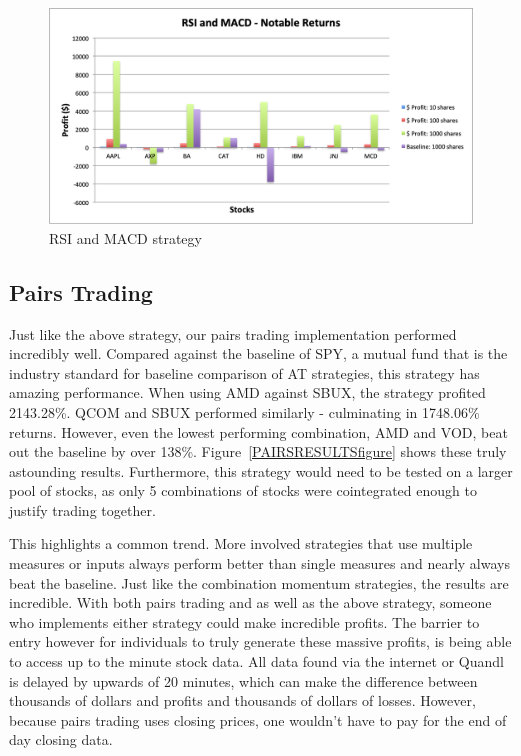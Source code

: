 \documentclass[letterpaper,11pt]{article}
\begin{document}
\begin{figure}[h]
\centering
\includegraphics[width=.9\textwidth]{rsimacdresults.png}
\caption{RSI and MACD strategy   \label{overflow}}
\label{RSIMACDRESULTSfigure}
\end{figure} 

\subsection{Pairs Trading}

Just like the above strategy, our pairs trading implementation performed incredibly well. Compared against the baseline of SPY, a mutual fund that is the industry standard for baseline comparison of AT strategies, this strategy has amazing performance. When using AMD against SBUX, the strategy profited 2143.28\%. QCOM and SBUX performed similarly - culminating in 1748.06\% returns. However, even the lowest performing combination, AMD and VOD, beat out the baseline by over 138\%. Figure~\ref{PAIRSRESULTSfigure} shows these truly astounding results. Furthermore, this strategy would need to be tested on a larger pool of stocks, as only 5 combinations of stocks were cointegrated enough to justify trading together. 

This highlights a common trend. More involved strategies that use multiple measures or inputs always perform better than single measures and nearly always beat the baseline. Just like the combination momentum strategies, the results are incredible. With both pairs trading and as well as the above strategy, someone who implements either strategy could make incredible profits. The barrier to entry however for individuals to truly generate these massive profits, is being able to access up to the minute stock data. All data found via the internet or Quandl is delayed by upwards of 20 minutes, which can make the difference between thousands of dollars and profits and thousands of dollars of losses. However, because pairs trading uses closing prices, one wouldn't have to pay for the end of day closing data.
\end{document}
